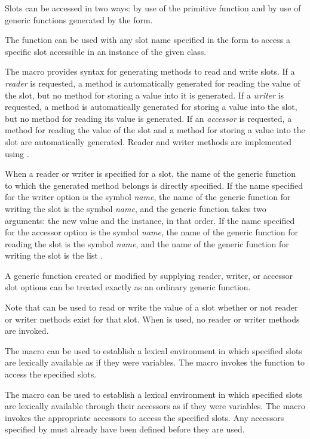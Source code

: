 Slots can be accessed in two ways: by use of the primitive function
 and by use of generic functions generated by the 
 form.

The function  can be used with any slot name
specified in the  form to access a specific slot
accessible in an instance of the given class.

The macro  provides syntax for generating methods to
read and write slots.  If a \emph{reader} is requested, a method is
automatically generated for reading the value of the slot, but no
method for storing a value into it is generated.  If a \emph{writer}
is requested, a method is automatically generated for storing a value
into the slot, but no method for reading its value is generated.  If
an \emph{accessor} is requested, a method for reading the value of
the slot and a method for storing a value into the slot are
automatically generated.  Reader and writer methods are implemented
using .

When a reader or writer is specified for a slot, the name of the
generic function to which the generated method belongs is directly
specified.  If the name specified for the writer option is the symbol
\emph{name}, the name of the generic function for writing the slot
is the symbol \emph{name}, and the generic function takes two
arguments: the new value and the instance, in that order.  If the name
specified for the accessor option is the symbol \emph{name}, the
name of the generic function for reading the slot is the symbol \emph{name}, and
the name of the generic function for writing the slot is 
the list .

A generic function created or modified by supplying reader, writer, or
accessor slot options can be treated exactly as an ordinary generic
function.

Note that  can be used to read or write the value of a
slot whether or not reader or writer methods exist for that slot.
When  is used, no reader or writer methods are
invoked.

The macro  can be used to establish a lexical
environment in which specified slots are lexically available as if they
were variables.  The macro  invokes the function 
 to access the specified slots.

The macro  can be used to establish a lexical
environment in which specified slots are lexically available through
their accessors as if they were variables.  The macro 
 invokes the appropriate accessors to access the
specified slots. Any accessors specified by  must
already have been defined before they are used.

